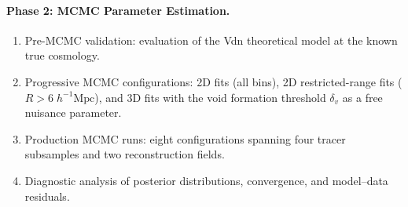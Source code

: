\documentclass[12pt]{report}
\begin{document}
\paragraph{Phase 2: MCMC Parameter Estimation.}
\begin{enumerate}
    \item Pre-MCMC validation: evaluation of the Vdn theoretical model at the known true cosmology.
    \item Progressive MCMC configurations: 2D fits (all bins), 2D restricted-range fits ($R > 6\;h^{-1}\mathrm{Mpc}$), and 3D fits with the void formation threshold $\delta_v$ as a free nuisance parameter.
    \item Production MCMC runs: eight configurations spanning four tracer subsamples and two reconstruction fields.
    \item Diagnostic analysis of posterior distributions, convergence, and model--data residuals.
\end{enumerate}
\end{document}
